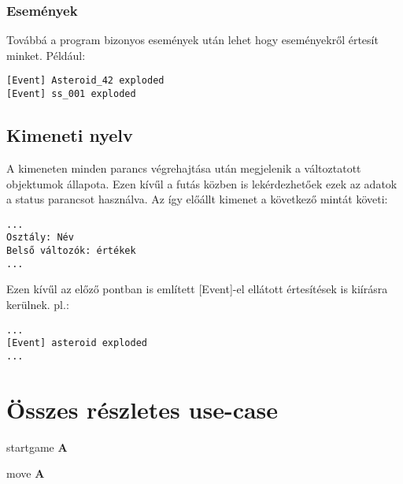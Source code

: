 \documentclass[../../projlab]{subfiles}
\begin{document}
\subsubsection{Események}
Továbbá a program bizonyos események után lehet hogy eseményekről értesít minket.
Például:
\begin{verbatim}
[Event] Asteroid_42 exploded
[Event] ss_001 exploded
\end{verbatim}


\subsection{Kimeneti nyelv}

A kimeneten minden parancs végrehajtása után megjelenik a változtatott objektumok állapota. Ezen kívűl a futás közben is lekérdezhetőek ezek az adatok a status parancsot használva.
Az így előállt kimenet a következő mintát követi:
\begin{verbatim}
...
Osztály: Név
Belső változók: értékek
...
\end{verbatim}

Ezen kívűl az előző pontban is említett [Event]-el ellátott értesítések is kiírásra kerülnek.
pl.:
\begin{verbatim}
...
[Event] asteroid exploded
...
\end{verbatim}



\section{Összes részletes use-case}
\begin{use-case}
    {startgame}
    { }
    {} 
    \textbf{A} \newline

\end{use-case}

\begin{use-case}
    {move}
    { }
    {} 
    \textbf{A} \newline

\end{use-case}
\end{document}
